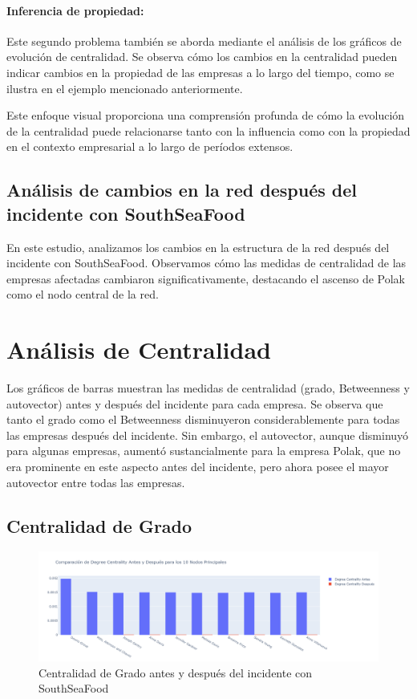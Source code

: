 \documentclass[11pt,spanish,a4paper]{article}
\begin{document}
\paragraph{Inferencia de propiedad:}
Este segundo problema también se aborda mediante el análisis de los gráficos de evolución de centralidad. Se observa cómo los cambios en la centralidad pueden indicar cambios en la propiedad de las empresas a lo largo del tiempo, como se ilustra en el ejemplo mencionado anteriormente.

Este enfoque visual proporciona una comprensión profunda de cómo la evolución de la centralidad puede relacionarse tanto con la influencia como con la propiedad en el contexto empresarial a lo largo de períodos extensos.

\subsection{Análisis de cambios en la red después del incidente con SouthSeaFood}

En este estudio, analizamos los cambios en la estructura de la red después del incidente con SouthSeaFood. Observamos cómo las medidas de centralidad de las empresas afectadas cambiaron significativamente, destacando el ascenso de Polak como el nodo central de la red.

\section{Análisis de Centralidad}

Los gráficos de barras muestran las medidas de centralidad (grado, Betweenness y autovector) antes y después del incidente para cada empresa. Se observa que tanto el grado como el Betweenness disminuyeron considerablemente para todas las empresas después del incidente. Sin embargo, el autovector, aunque disminuyó para algunas empresas, aumentó sustancialmente para la empresa Polak, que no era prominente en este aspecto antes del incidente, pero ahora posee el mayor autovector entre todas las empresas.

\subsection{Centralidad de Grado}

\begin{figure}[H]
    \centering
    \includegraphics[width=0.8\linewidth]{graphs/degree_centrality_after_before_southseafood_top10.png}
    \caption{Centralidad de Grado antes y después del incidente con SouthSeaFood}
    \label{fig:cent_grado}
\end{figure}
\end{document}
